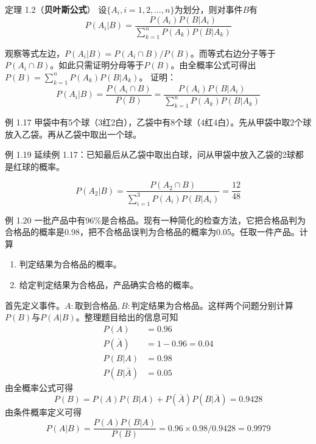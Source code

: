 \documentclass{beamer}
\begin{document}
	\begin{frame}
		定理 1.2（\textbf{贝叶斯公式}） 设$\{A_i, i = 1, 2, \dots, n\}$为划分，则对事件$B$有
		\[
		P(A_i | B) = \frac{P(A_i)P(B | A_i)}{\sum_{k = 1}^{n}P(A_k)P(B | A_k)}
		\]
		
	\end{frame}
	
	\begin{frame}
		观察等式左边，$P(A_i | B) = P(A_i \cap B) / P(B)$。而等式右边分子等于$P(A_i \cap B)$。如此只需证明分母等于$P(B)$。由全概率公式可得出$P(B) = \sum_{k = 1}^{n}P(A_k)P(B | A_k)$。
		证明：
		\[
		P(A_i | B) = \frac{P(A_i \cap B)}{P(B)} = \frac{P(A_i)P(B | A_i)}{\sum_{k = 1}^{n}P(A_k)P(B | A_k)}
		\]
	\end{frame}
	
	\begin{frame}
		例 1.17 甲袋中有5个球（3红2白），乙袋中有8个球（4红4白）。先从甲袋中取2个球放入乙袋。再从乙袋中取出一个球。
		
		例 1.19 延续例 1.17：已知最后从乙袋中取出白球，问从甲袋中放入乙袋的2球都是红球的概率。
	\end{frame}
	
	\begin{frame}
		\[
		P(A_2 | B) = \frac{P(A_2 \cap B)}{\sum_{i = 1}^{3}P(A_i)P(B | A_i)} = \frac{12}{48}
		\]
	\end{frame}
	
	\begin{frame}
		例 1.20 一批产品中有96\%是合格品。现有一种简化的检查方法，它把合格品判为合格品的概率是0.98，把不合格品误判为合格品的概率为0.05。任取一件产品。计算
		\begin{enumerate}
			\item 判定结果为合格品的概率。
			\item 给定判定结果为合格品，产品确实合格的概率。
		\end{enumerate}
	\end{frame}
	
	\begin{frame}
		首先定义事件。$A: \text{取到合格品}, B: \text{判定结果为合格品}$。这样两个问题分别计算$P(B)$与$P(A | B)$。整理题目给出的信息可知
		\begin{align}
			P(A) &= 0.96 \\
			P(\bar{A}) &= 1 - 0.96 = 0.04 \\
			P(B | A) &= 0.98 \\
			P(B | \bar{A}) &= 0.05
		\end{align}
		由全概率公式可得
		\[
		P(B) = P(A) P(B | A) + P(\bar{A}) P(B | \bar{A}) = 0.9428
		\]
		由条件概率定义可得
		\[
		P(A | B) = \frac{P(A)P(B | A)}{P(B)} = 0.96 \times 0.98 / 0.9428 =0.9979
		\]
	\end{frame}
		
\end{document}
